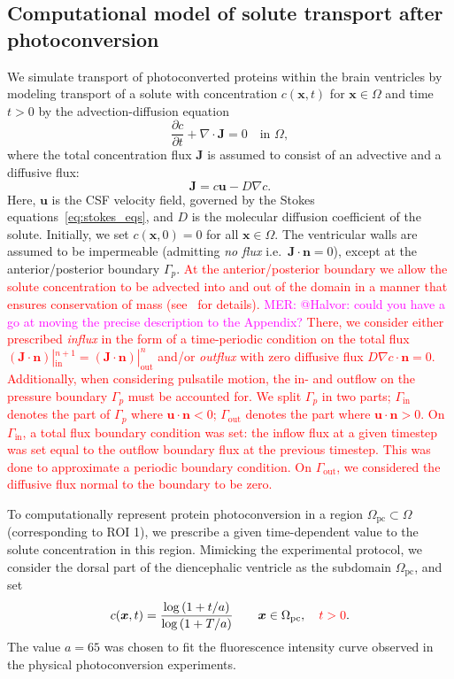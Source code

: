 \documentclass[fleqn]{wlscirep}
\newcommand{\pdifft}[1]{\frac{\partial  #1}{\partial t}}
\newcommand{\Gp}{\Gamma_{p}}
\newcommand{\Gin}{\Gamma_{\mathrm{in}}}
\newcommand{\Gout}{\Gamma_{\mathrm{out}}}
\newcommand{\nn}{\mathbf{n}}
\newcommand{\uu}{\mathbf{u}}
\newcommand{\xx}{\bm{x}}
\newcommand{\JJ}{\mathbf{J}}
\newcommand{\mer}[1]{\textcolor{magenta}{#1}}
\newcommand{\fixme}[1]{\textcolor{red}{#1}}
\begin{document}
\subsection*{Computational model of solute transport after photoconversion}
We simulate transport of photoconverted proteins within the brain ventricles by modeling transport of a solute with concentration $c(\xx, t)$ for $\xx\in\Omega$ and time $t > 0$ by the advection-diffusion equation
\begin{equation}
    \pdifft{c} + \nabla\cdot\JJ = 0 \quad \text{in } \Omega,
    \label{eq:adv_diff_strong}
\end{equation}
where the total concentration flux $\mathbf{J}$ is assumed to consist of an advective and a diffusive flux:
\begin{equation*}
    \JJ = c\uu - D\nabla c .
\end{equation*}
Here, $\uu$ is the CSF velocity field, governed by the Stokes equations~\eqref{eq:stokes_eqs}, and $D$ is the molecular diffusion coefficient of the solute. Initially, we set $c(\xx, 0)=0$ for all $\xx\in\Omega$.
The ventricular walls are assumed to be impermeable (admitting \emph{no flux} i.e.~$\JJ\cdot\nn=0$), except at the anterior/posterior boundary $\Gamma_p$.
\fixme{At the anterior/posterior boundary we allow the solute concentration to be advected into and out of the domain in a manner that ensures conservation of mass (see~\Cref{sec:appendix:X} for details).}
\mer{MER: @Halvor: could you have a go at moving the precise description to the Appendix?}
\fixme{There, we consider either prescribed \emph{influx} in the form of a time-periodic condition on the total flux $(\JJ\cdot\nn)|_{\mathrm{in}}^{n+1}=(\JJ\cdot\nn)|_{\mathrm{out}}^{n}$ and/or \emph{outflux} with zero diffusive flux $D\nabla c\cdot\nn=0$.}
\fixme{Additionally, when considering pulsatile motion, the in- and outflow on the pressure boundary $\Gp$ must be accounted for. We split $\Gp$ in two parts; $\Gin$ denotes the part of $\Gp$ where $\uu\cdot\nn < 0$;
$\Gout$ denotes the part where $\uu\cdot\nn > 0$. On $\Gin$, a total flux boundary condition was set: the inflow flux at a given timestep was set equal to the outflow boundary flux at the previous timestep.
This was done to approximate a periodic boundary condition. On $\Gout$, we considered the diffusive flux normal to the boundary to be zero.}

To computationally represent protein photoconversion in a region $\Omega_{\mathrm{pc}} \subset \Omega$ (corresponding to ROI 1), we prescribe a given time-dependent value to the solute concentration in this region. 
Mimicking the experimental protocol, we consider the dorsal part of the diencephalic ventricle as the subdomain $\Omega_{\mathrm{pc}}$, and set
\begin{equation}
  c(\xx, t)=\frac{\log{(1+t/a)}}{\log{(1+T/a)}}
  \qquad \xx \in \Omega_{\mathrm{pc}}, \quad \fixme{t > 0}.
\label{eq:injection_curve}
\end{equation}
The value $a=65$ was chosen to fit the fluorescence intensity curve observed in the physical photoconversion experiments.
\end{document}
